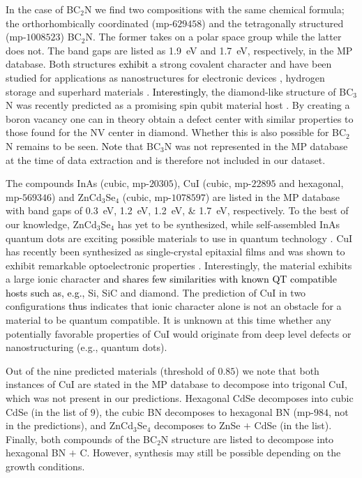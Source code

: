 \documentclass[superscriptaddress,unsortedaddress,
 amsmath,amssymb,
 aps,
]{revtex4-2}
\newcommand{\mrk}[1]{\textcolor{black}{#1}}
\begin{document}
In the case of BC$_2$N we find two compositions with the same chemical formula; the orthorhombically coordinated (mp-$629458$) and the tetragonally structured (mp-$1008523$) BC$_2$N. The former takes on a polar space group while the latter does not. The band gaps are listed as \SI{1.9}{\electronvolt} and \SI{1.7}{\electronvolt}, respectively, in the MP database. Both structures \mrk{exhibit a} strong covalent character and have been studied for applications as nanostructures for electronic devices \cite{Gao2017}, hydrogen storage \cite{Cai2017} and superhard materials \cite{Li2017, Jiang2020}. \mrk{Interestingly}, the diamond-like structure of BC$_3$N was recently predicted as a promising  spin qubit material host \cite{Wang2020SpinQB}. By creating a boron vacancy one can in theory obtain a defect center with similar properties to those found for the NV center in diamond. Whether this is also possible for BC$_2$N remains to be seen. \mrk{Note} that BC$_3$N was not represented in the MP database at the time of data extraction and is therefore not included in our dataset. 

The compounds InAs (cubic, mp-$20305$), CuI (cubic, mp-$22895$ and hexagonal, mp-$569346$) and ZnCd$_3$Se$_4$ (cubic, mp-$1078597$) are listed in the MP database with band gaps of \SIlist{0.3;1.2;1.2;1.7}{\electronvolt}, respectively. 
To the best of our knowledge, ZnCd$_3$Se$_4$ has yet to be synthesized, while self-assembled InAs quantum dots are  exciting possible materials to use in quantum technology \cite{Liu2018}. 
CuI has recently been synthesized as single-crystal epitaxial films and was shown to exhibit remarkable optoelectronic properties \cite{Ahn2020}. Interestingly, the material exhibits a large ionic character 
\mrk{and shares few similarities with known QT compatible hosts such as, e.g.,} Si, SiC and  diamond. The prediction of CuI in two configurations \mrk{thus} indicates that ionic character alone is not an obstacle for a material to be quantum compatible. It is unknown at this time whether any potentially favorable properties of CuI would originate from deep level defects or  nanostructuring (e.g., quantum dots). %

Out of the nine predicted materials (threshold of $0.85$) we note that both instances of CuI are stated in the MP database to decompose into trigonal CuI, which was not present in our predictions. Hexagonal CdSe decomposes into cubic CdSe (in the list of $9$), the cubic BN decomposes to hexagonal BN (mp-$984$, not in the predictions), and ZnCd$_3$Se$_4$ decomposes to ZnSe $+$ CdSe (in the list). Finally, both compounds of the BC$_2$N structure are listed to decompose into hexagonal BN $+$ C. 
However, synthesis may still be possible depending on the growth conditions. 
\end{document}
